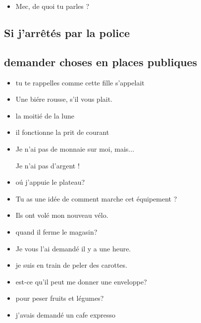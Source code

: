 \begin{itemize}

\item Mec, de quoi tu parles ?

\end{itemize} 

\subsection{Si j'arr\^et\'es par la police}

\subsection{demander choses en places publiques}

\begin{itemize}

\item tu te rappelles comme cette fille s'appelait

\item Une bi\'ere rousse, s'il vous plait.

\item la moiti\'e de la lune
\item il fonctionne la prit de courant

\item Je n'ai pas de monnaie sur moi, mais...

Je n'ai pas d'argent !

\item o\'u j'appuie le plateau?

\item Tu as une id\'ee de comment marche cet \'equipement ?

\item Ils ont vol\'e mon nouveau v\'elo.

\item quand il ferme le magasin?

\item Je vous l'ai demand\'e il y a une heure.

\item je suis en train de peler des carottes.

\item est-ce qu'il peut me donner une enveloppe?

\item pour peser fruits et légumes?

\item j'avais demand\'e un cafe expresso


\end{itemize}
